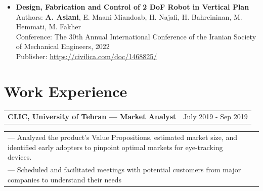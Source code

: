 \documentclass[a4paper,12pt]{article}
\begin{document}
\begin{itemize}
    \item \textbf{Design, Fabrication and Control of 2 DoF Robot in Vertical Plan}\\
    Authors: \textbf{A. Aslani}, E. Maani Miandoab, H. Najafi, H. Bahreininan, M. Hemmati, M. Fakher\\
    Conference: The 30th Annual International Conference of the Iranian Society of Mechanical Engineers, 2022\\
    Publisher:  \href{https://civilica.com/doc/1468825/}{https://civilica.com/doc/1468825/}
\end{itemize}




\section{Work Experience}

\begin{tabularx}{\linewidth}{@{}X r@{}}
    \textbf{CLIC, University of Tehran — Market Analyst} & \hfill July 2019 - Sep 2019 \\[3.75pt]
\end{tabularx}

\begin{tabularx}{\linewidth}{@{}X r@{}}
    {— Analyzed the product's Value Propositions, estimated market size, and identified early adopters to pinpoint optimal markets for eye-tracking devices.}\\
    {— Scheduled and facilitated meetings with potential customers from major companies to understand their needs}\\
\end{tabularx}



\end{document}
